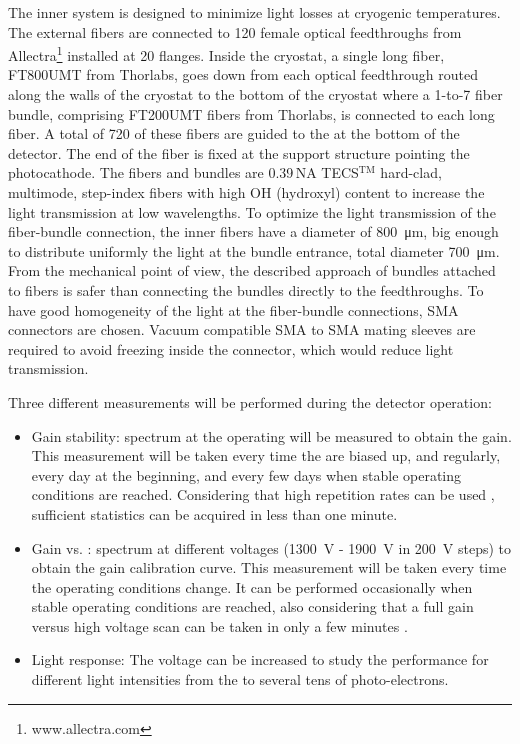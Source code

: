 
The inner system is designed to minimize light losses at cryogenic temperatures. The external fibers are connected to 120 female optical feedthroughs from Allectra\footnote{www.allectra.com} installed at \num{20} flanges. Inside the cryostat, a single long fiber, FT800UMT from Thorlabs, goes down from each optical feedthrough routed along the walls of the cryostat to the bottom of the cryostat where a \num{1}-to-\num{7} fiber bundle, comprising FT200UMT fibers from Thorlabs, is connected to each long fiber. A total of \num{720} of these fibers are guided to the  at the bottom of the detector. The end of the fiber is fixed at the  support structure pointing the photocathode. The fibers and bundles are \num{0.39}\,NA TECS$^\text{TM}$ hard-clad, multimode, step-index fibers with high OH (hydroxyl) content to increase the light transmission at low wavelengths. To optimize the light transmission of the fiber-bundle connection, the inner fibers have a diameter of \SI{800}{\um}, big enough to distribute uniformly the light at the bundle entrance, total diameter \SI{700}{\um}. From the mechanical point of view, the described approach of bundles attached to fibers is safer than connecting  the bundles directly to the feedthroughs. To have good homogeneity of the light at the fiber-bundle connections, SMA connectors are chosen. Vacuum compatible SMA to SMA mating sleeves are required to avoid  freezing inside the connector, which would reduce light transmission.

Three different measurements will be performed during the detector operation:
\begin{itemize}
    \item Gain stability:  spectrum at the  operating  will be measured to obtain the gain. This measurement will be taken every time the  are biased up, and regularly, every day at the beginning, and every few days when stable operating conditions are reached. Considering that high  repetition rates can be used \cite{Belver:2019lqm}, sufficient  statistics can be acquired in less than one minute. 
    \item Gain vs. :  spectrum at different  voltages (\SI{1300}{\V} - \SI{1900}{V} in \SI{200}{V} steps) to obtain the gain calibration curve. This measurement will be taken every time the operating conditions change. It can be performed occasionally when stable operating conditions are reached, also considering that a full gain versus high voltage scan can be taken in only a few minutes .  
    \item Light response: The  voltage can be increased to study the  performance for different light intensities from the  to several tens of photo-electrons.
\end{itemize}

